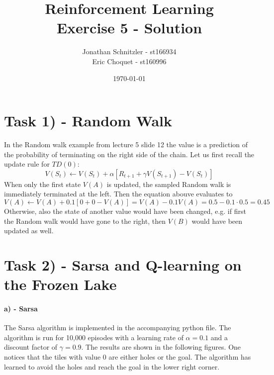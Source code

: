 \documentclass{article}
\title{Reinforcement Learning \\ Exercise 5 - Solution}
\author{Jonathan Schnitzler - st166934 \\
Eric Choquet - st160996}
\date{\today}
\begin{document}
\maketitle
\section*{Task 1) - Random Walk}
In the Random walk example from lecture 5 slide 12 the value is a prediction of the probability of terminating on the right side of the chain. Let us first recall the update rule for $TD(0)$:
\begin{equation}
    V(S_t) \leftarrow V(S_t) + \alpha \left[ R_{t+1} + \gamma V(S_{t+1}) - V(S_t) \right]
\end{equation}
When only the first state $V(A)$ is updated, the sampled Random walk is immediately terminated at the left. Then the equation abouve evaluates to
\begin{equation}
    V(A) \leftarrow V(A) + 0.1 \left[ 0 + 0 - V(A) \right] = V(A) - 0.1 V(A) = 0.5 - 0.1 \cdot 0.5 = 0.45
\end{equation}
Otherwise, also the state of another value would have been changed, e.g. if first the Random walk would have gone to the right, then $V(B)$ would have been updated as well.

\section*{Task 2) - Sarsa and Q-learning on the Frozen Lake}

\paragraph*{a) - Sarsa}

The Sarsa algorithm is implemented in the accompanying python file. The algorithm is run for 10,000 episodes with a learning rate of $\alpha = 0.1$ and a discount factor of $\gamma = 0.9$. The results are shown in the following figures. One notices that the tiles with value 0 are either holes or the goal. The algorithm has learned to avoid the holes and reach the goal in the lower right corner.
\end{document}
